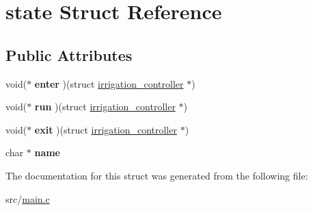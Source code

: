\hypertarget{structstate}{}\section{state Struct Reference}
\label{structstate}
\subsection*{Public Attributes}
\begin{DoxyCompactItemize}
\item 
\hypertarget{structstate_a6524009fb107464c8bb47a14742c3f27}{}void($\ast$ {\bfseries enter} )(struct \hyperlink{structirrigation__controller}{irrigation\+\_\+controller} $\ast$)\label{structstate_a6524009fb107464c8bb47a14742c3f27}

\item 
\hypertarget{structstate_a64a1989f8b49bc262c04323be37d1d8c}{}void($\ast$ {\bfseries run} )(struct \hyperlink{structirrigation__controller}{irrigation\+\_\+controller} $\ast$)\label{structstate_a64a1989f8b49bc262c04323be37d1d8c}

\item 
\hypertarget{structstate_a4657a6bf0f9e2f16002217c54cb967cd}{}void($\ast$ {\bfseries exit} )(struct \hyperlink{structirrigation__controller}{irrigation\+\_\+controller} $\ast$)\label{structstate_a4657a6bf0f9e2f16002217c54cb967cd}

\item 
\hypertarget{structstate_a351d79011f95723018e1626646bb28c7}{}char $\ast$ {\bfseries name}\label{structstate_a351d79011f95723018e1626646bb28c7}

\end{DoxyCompactItemize}


The documentation for this struct was generated from the following file\+:\begin{DoxyCompactItemize}
\item 
src/\hyperlink{main_8c}{main.\+c}\end{DoxyCompactItemize}
